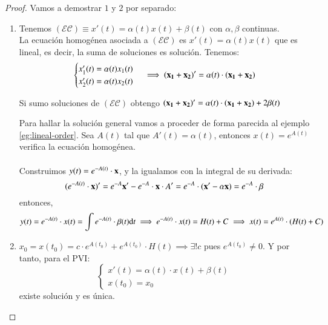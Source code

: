 \begin{proof}
    Vamos a demostrar $1$ y $2$ por separado:
    \begin{enumerate}
        \item Tenemos $\mathcal{(EC)} \equiv x'(t) = \alpha(t)x(t) + \beta(t)$ con $\alpha, \beta$ continuas.\\
        La ecuación homogénea asociada a $\mathcal{(EC)}$ es $x'(t) = \alpha(t)x(t)$ que es lineal, es decir, la suma de soluciones es solución. Tenemos:
        $$
        \begin{cases}
            x_1'(t) = \alpha(t)x_1(t)\\
            x_2'(t) = \alpha(t)x_2(t)
        \end{cases} \implies (\mathbf{x_1} + \mathbf{x_2})' = \alpha(t)\cdot(\mathbf{x_1} + \mathbf{x_2})
        $$
        \begin{obs}
            Si sumo soluciones de $\mathcal{(EC)}$ obtengo $(\mathbf{x_1} + \mathbf{x_2})' = \alpha(t)\cdot(\mathbf{x_1} + \mathbf{x_2}) + 2\beta(t)$
        \end{obs}
        Para hallar la solución general vamos a proceder de forma parecida al ejemplo \ref{eg:lineal-order}. Sea $A(t)$ tal que $A'(t) = \alpha(t)$, entonces $x(t) = e^{A(t)}$ verifica la ecuación homogénea.\\\\
        Construimos $y(t) = e^{-A(t)}\cdot\mathbf{x}$, y la igualamos con la integral de su derivada:
        $$
            (e^{-A(t)}\cdot\mathbf{x})' = e^{-A}\mathbf{x'} - e^{-A}\cdot \mathbf{x} \cdot A' = e^{-A} \cdot (\mathbf{x'} - \alpha \mathbf{x}) = e^{-A} \cdot \beta
        $$
        entonces,
        $$
            y(t) = e^{-A(t)} \cdot x(t) = \int e^{-A(t)}\cdot\beta(t) \mathrm{d} t \implies e^{-A(t)} \cdot x(t) = H(t) + C \implies x(t) = e^{A(t)} \cdot (H(t) + C)
        $$
        \item $x_0 = x(t_0) = c\cdot e^{A(t_0)} + e^{A(t_0)} \cdot H(t) \implies \exists ! c$ pues $e^{A(t_0)} \neq 0$. Y por tanto, para el PVI:
        $$
            \begin{cases}
                x'(t) = \alpha(t)\cdot x(t) + \beta(t)\\
                x(t_0) = x_0
            \end{cases}
        $$existe solución y es única.
    \end{enumerate}
\end{proof}

